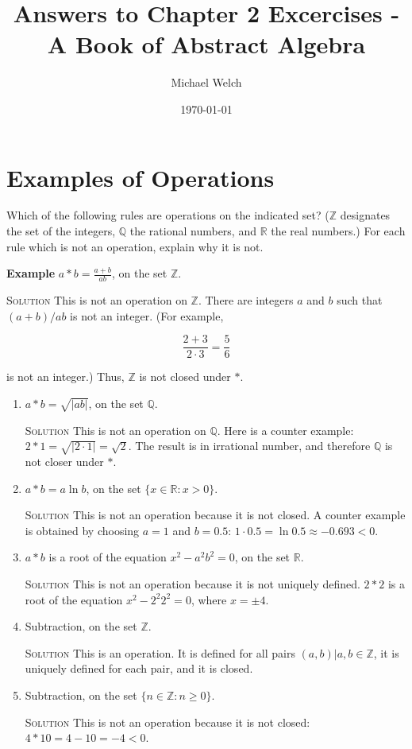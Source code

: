 \documentclass[draft,twoside]{amsart}
\newcommand{\Rationals}{\mathbb{Q}{}}
\newcommand{\Reals}{\mathbb{R}{}}
\newcommand{\Integers}{\mathbb{Z}{}}
\newcommand{\Solution}{\textsc{Solution}\xspace}
\begin{document}
\title{Answers to Chapter 2 Excercises - A Book of Abstract Algebra}
\author{Michael Welch}
\date{\today}
\maketitle

\section{Examples of Operations}
Which of the following rules are operations on the indicated set?  ($\Integers$
designates the set of the integers, $\Rationals$ the rational numbers, and
$\Reals$ the real numbers.) For each rule which is not an operation, explain
why it is not. 

\textbf{Example} $a * b = \displaystyle \frac{a + b}{ab}$, on the set
$\Integers$. 

\Solution This is not an operation on  $\Integers$. There are integers
$a$ and $b$ such that $(a+b)/ab$ is not an integer. (For example,

\[
\frac{2+3}{2 \cdot 3} = \frac{5}{6}
\]

is not an integer.) Thus, $\Integers$ is not closed under $*$. 

\begin{enumerate}

\item $a*b = \sqrt{|ab|}$, on the set $\Rationals$. 

\Solution This is not an operation on $\Rationals$. Here is a counter
example: $2*1 = \sqrt{|2 \cdot 1|} = \sqrt{2}$. The result is in irrational
number, and therefore $\Rationals$ is not closer under $*$.


\item $a*b = a \ln b$, on the set $\{x \in \Reals  : x > 0\}$. 

\Solution This is not an operation because it is not closed. A counter 
example is obtained by choosing $a=1$ and $b=0.5$: 
$1 \cdot 0.5 = \ln 0.5 \approx -0.693 < 0$. 


\item $a*b$ is a root of the equation $x^2 - a^2 b^2 = 0$, on the set $\Reals$.


\Solution This is not an operation because it is not uniquely defined.
$2*2$ is a root of the equation $x^2 - 2^2 2^2 = 0$, where $x = \pm 4$.


\item Subtraction, on the set $\Integers$.

\Solution This is an operation. It is defined for all pairs 
${(a,b) | a,b \in \Integers}$, it is uniquely defined for each pair, and it
is closed.


\item Subtraction, on the set $\{ n \in \Integers : n \ge 0\}$.

\Solution This is not an operation because it is not closed:
$4*10 = 4 - 10 = -4 < 0$.



\end{enumerate}
\end{document}
